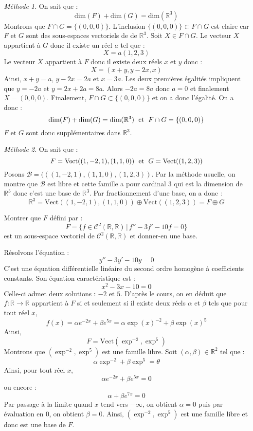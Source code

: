 \documentclass[a4paper,twoside,french,11pt]{VcCours}
\begin{document}
\medskip

\textit{Méthode 1.} On sait que :
$$ \textrm{dim}(F) + \textrm{dim}(G) = \textrm{dim}(\mathbb{R}^3)$$
Montrons que $F \cap G = \lbrace (0,0,0) \rbrace$. L'inclusion $ \lbrace (0,0,0) \rbrace \subset F \cap G$ est claire car $F$ et $G$ sont des sous-espaces vectoriels de de $\mathbb{R}^3$. Soit $X \in F \cap G$. Le vecteur $X$ appartient à $G$ donc il existe un réel $a$ tel que :
$$ X = a(1,2,3)$$
Le vecteur $X$ appartient à $F$ donc il existe deux réels $x$ et $y$ donc :
$$ X = (x+y,y-2x,x)$$
Ainsi, $x+y=a$, $y-2x=2a$ et $x=3a$. Les deux premières égalités impliquent que $y=-2a$ et $y=2x+2a=8a$. Alors $-2a=8a$ donc $a=0$ et finalement $X=(0,0,0)$. Finalement, $F \cap G \subset \lbrace (0,0,0) \rbrace$ et on a donc l'égalité. On a donc :
$$  \textrm{dim}(F) + \textrm{dim}(G) = \textrm{dim}(\mathbb{R}^3) \; \hbox{ et } \; F \cap G = \lbrace (0,0,0) \rbrace$$
$F$ et $G$ sont donc supplémentaires dans $\mathbb{R}^3$.

\medskip

\textit{Méthode 2.} On sait que :
$$ F=\textrm{Vect}((1,-2,1),(1,1,0)) \; \hbox{ et } \; G=\textrm{Vect}((1,2,3))$$
Posons $\mathcal{B}=(((1,-2,1),(1,1,0),(1,2,3))$. Par la méthode usuelle, on montre que $\mathcal{B}$ est libre et cette famille a pour cardinal $3$ qui est la dimension de $\mathbb{R}^3$ donc c'est une base de $\mathbb{R}^3$. Par fractionnement d'une base, on a donc :
$$ \mathbb{R}^3 =  \textrm{Vect}((1,-2,1),(1,1,0)) \oplus \textrm{Vect}((1,2,3)) = F \oplus G$$

\begin{Exercice}{} Montrer que $F$ défini par :
$$ F=\lbrace f \in \mathcal{C}^2(\mathbb{R}, \mathbb{R}) \, \vert \,  f''-3f'-10f= 0 \rbrace $$
est un sous-espace vectoriel de $\mathcal{C}^2(\mathbb{R}, \mathbb{R})$ et donner-en une base.
\end{Exercice} 

\corr Résolvons l'équation :
$$ y''-3y'-10y = 0$$
C'est une équation différentielle linéaire du second ordre homogène à coefficients constants. Son équation caractéristique est :
$$ x^2-3x-10=0$$
Celle-ci admet deux solutions : $-2$ et $5$. D'après le cours, on en déduit que $f : \mathbb{R} \rightarrow \mathbb{R}$ appartient à $F$ si et seulement si il existe deux réels $\alpha$ et $\beta$ tels que pour tout réel $x$,
$$ f(x) = \alpha e^{-2x} + \beta e^{5x} = \alpha \exp(x)^{-2} + \beta \exp(x)^5$$
Ainsi,
$$ F = \textrm{Vect}(\exp^{-2}, \exp^5)$$
Montrons que $(\exp^{-2}, \exp^5)$ est une famille libre. Soit $(\alpha, \beta) \in \mathbb{R}^2$ tel que :
$$ \alpha \exp^{-2} + \beta \exp^5 = \theta$$
Ainsi, pour tout réel $x$,
$$ \alpha e^{-2x} + \beta e^{5x} = 0$$
ou encore :
$$ \alpha  + \beta e^{7x} = 0$$
Par passage à la limite quand $x$ tend vers $- \infty$, on obtient $\alpha=0$ puis par évaluation en $0$, on obtient $\beta =0$. Ainsi, $(\exp^{-2}, \exp^5)$ est une famille libre et donc est une base de $F$.
\end{document}

